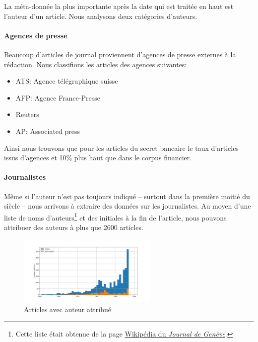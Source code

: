 \documentclass[11pt]{article}
\begin{document}
La méta-donnée la plus importante après la date qui est traitée en haut
est l'auteur d'un article. Nous analysons deux catégories d'auteurs.

\hypertarget{agences-de-presse}{%
\paragraph{Agences de presse}\label{agences-de-presse}}

Beaucoup d'articles de journal proviennent d'agences de presse externes
à la rédaction. Nous classifions les articles des agences suivantes:

\begin{itemize}
\item
  ATS: Agence télégraphique suisse
\item
  AFP: Agence France-Presse
\item
  Reuters
\item
  AP: Associated press
\end{itemize}

Ainsi nous trouvons que pour les articles du secret bancaire le taux
d'articles issus d'agences et 10\% plus haut que dans le corpus
financier.

\newpage

\hypertarget{journalistes}{%
\paragraph{Journalistes}\label{journalistes}}

Même si l'auteur n'est pas toujours indiqué -- surtout dans la première
moitié du siècle -- nous arrivons à extraire des données sur les
journalistes. Au moyen d'une liste de noms d'auteurs\footnote{Cette
  liste était obtenue de la page
  \href{https://fr.wikipedia.org/wiki/Journal_de_Gen\%C3\%A8ve}{Wikipédia
  du \emph{Journal de Genève}}.} et des initiales à la fin de l'article,
nous pouvons attribuer des auteurs à plus que 2600 articles.

\begin{figure}
\centering
\includegraphics[width=0.6\textwidth]{methodology/author_attributed.png}
\caption{Articles avec auteur attribué}
\end{figure}
\end{document}
